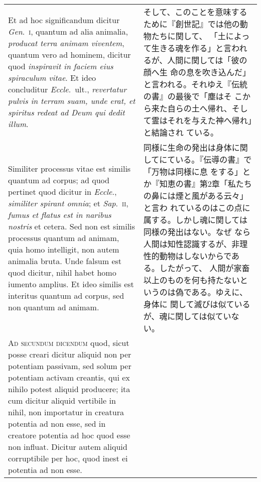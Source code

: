 \documentclass[10pt]{jsarticle} %
\begin{document}
\begin{longtable}{p{21em}p{21em}}
\\


Et ad hoc significandum
dicitur {\itshape Gen}.~{\scshape i}, quantum ad alia animalia, {\itshape producat terra animam
viventem}, quantum vero ad hominem, dicitur quod {\itshape inspiravit in faciem
eius spiraculum vitae}. Et ideo concluditur {\itshape Eccle}.~ult., {\itshape revertatur
pulvis in terram suam, unde erat, et spiritus redeat ad Deum qui dedit
illum}. 


&

そして、このことを意味するために『創世記』では他の動物たちに関して、
 「土によって生きる魂を作る」と言われるが、人間に関しては「彼の顔へ生
 命の息を吹き込んだ」と言われる。それゆえ『伝統の書』の最後で「塵はそ
 こから来た自らの土へ帰れ、そして霊はそれを与えた神へ帰れ」と結論され
 ている。



\\


Similiter processus vitae est similis quantum ad corpus; ad
quod pertinet quod dicitur in {\itshape Eccle}., {\itshape similiter spirant omnia}; et
{\itshape Sap}.~{\scshape ii}, {\itshape fumus et flatus est in naribus nostris} et cetera. Sed non est
similis processus quantum ad animam, quia homo intelligit, non autem
animalia bruta. Unde falsum est quod dicitur, nihil habet homo iumento
amplius. Et ideo similis est interitus quantum ad corpus, sed non
quantum ad animam.


&

同様に生命の発出は身体に関してにている。『伝導の書』で「万物は同様に息
 をする」とか『知恵の書』第2章「私たちの鼻には煙と風がある云々」と言わ
 れているのはこの点に属する。しかし魂に関しては同様の発出はない。なぜ
 なら人間は知性認識するが、非理性的動物はしないからである。したがって、
 人間が家畜以上のものを何も持たないというのは偽である。ゆえに、身体に
 関して滅びは似ているが、魂に関しては似ていない。


\\



{\scshape Ad secundum dicendum} quod, sicut posse creari dicitur aliquid non per
potentiam passivam, sed solum per potentiam activam creantis, qui ex
nihilo potest aliquid producere; ita cum dicitur aliquid vertibile in
nihil, non importatur in creatura potentia ad non esse, sed in
creatore potentia ad hoc quod esse non influat. Dicitur autem aliquid
corruptibile per hoc, quod inest ei potentia ad non esse.


&


\end{longtable}
\end{document}
